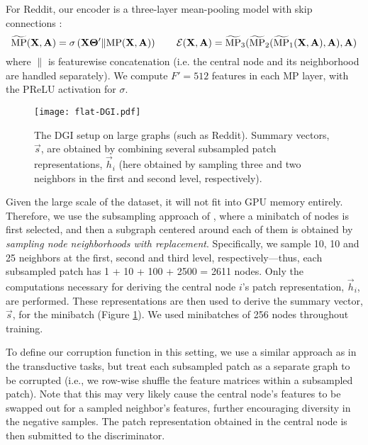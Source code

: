 \documentclass{article} \usepackage{iclr2019_conference,times}
\begin{document}
For Reddit, our encoder is a three-layer mean-pooling model with skip connections \citep{he2016deep}:
\begin{equation}
    \widetilde{\text{MP}}({\bf X}, {\bf A}) = \sigma\left({\bf X}{\bf \Theta'}\|\text{MP}({\bf X}, {\bf A})\right) \qquad \mathcal{E}({\bf X}, {\bf A}) = \widetilde{\text{MP}}_3(\widetilde{\text{MP}}_2(\widetilde{\text{MP}}_1({\bf X}, {\bf A}), {\bf A}), {\bf A})
\end{equation}
where $\|$ is featurewise concatenation (i.e. the central node and its neighborhood are handled separately). We compute $F'=512$ features in each MP layer, with the PReLU activation for $\sigma$.
\begin{figure}
    \centering
    \texttt{[image: flat-DGI.pdf]}
    \caption{The DGI setup on large graphs (such as Reddit). Summary vectors, $\vec{s}$, are obtained by combining several subsampled patch representations, $\vec{h}_i$ (here obtained by sampling three and two neighbors in the first and second level, respectively).}
    \label{fig:subdgi}
\end{figure}

Given the large scale of the dataset, it will not fit into GPU memory entirely. Therefore, we use the subsampling approach of \cite{hamilton2017inductive}, where a minibatch of nodes is first selected, and then a subgraph centered around each of them is obtained by \emph{sampling node neighborhoods with replacement}. Specifically, we sample 10, 10 and 25 neighbors at the first, second and third level, respectively---thus, each subsampled patch has 1 + 10 + 100 + 2500 = 2611 nodes. Only the computations necessary for deriving the central node $i$'s patch representation, $\vec{h}_i$, are performed. These representations are then used to derive the summary vector, $\vec{s}$, for the minibatch (Figure \ref{fig:subdgi}). We used minibatches of 256 nodes throughout training.

To define our corruption function in this setting, we use a similar approach as in the transductive tasks, but treat each subsampled patch as a separate graph to be corrupted (i.e., we row-wise shuffle the feature matrices within a subsampled patch). Note that this may very likely cause the central node's features to be swapped out for a sampled neighbor's features, further encouraging diversity in the negative samples. The patch representation obtained in the central node is then submitted to the discriminator.
\end{document}
